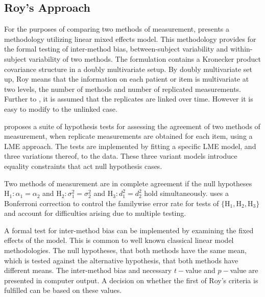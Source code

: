 \documentclass[12pt, a4paper]{report}
\theoremstyle{plain}
\theoremstyle{definition}
\theoremstyle{remark}
\begin{document}






		\subsection{Roy's Approach}
		
		For the purposes of comparing two methods of measurement, \citet{ARoy2009} presents a methodology utilizing linear mixed effects model. This methodology provides for the formal testing of inter-method bias, between-subject variability and within-subject variability of two methods. The formulation contains a Kronecker product covariance structure in a doubly multivariate setup. By doubly multivariate set up, Roy means that the information on each patient or item is multivariate at two levels, the number of methods and number of replicated measurements. Further to \citet{lam}, it is assumed that the replicates are linked over time. However it is easy to modify to the unlinked case.
		

	
	
			\citet{ARoy2009} proposes a suite of hypothesis tests for assessing the agreement of two methods of measurement, when replicate measurements are obtained for each item, using a LME approach. The tests are implemented by fitting a specific LME model, and three variations thereof, to the data. These three variant models introduce equality constraints that act null hypothesis cases.
			
			Two methods of measurement are in complete agreement if the null hypotheses $\mathrm{H}_1\colon \alpha_1 = \alpha_2$ and $\mathrm{H}_2\colon \sigma^2_1 = \sigma^2_2 $ and $\mathrm{H}_3\colon d^2_1= d^2_2$ hold simultaneously. \citet{ARoy2009} uses a Bonferroni correction to control the familywise error rate for tests of $\{\mathrm{H}_1, \mathrm{H}_2, \mathrm{H}_3\}$ and account for difficulties arising due to multiple testing. 
				
		A formal test for inter-method bias can be implemented by examining the fixed effects of the model. This is common to well known classical linear model methodologies. The null hypotheses, that both methods have the same mean, which is tested against the alternative hypothesis, that both methods have different means.
		The inter-method bias and necessary $t-$value and $p-$value are presented in computer output. A decision on whether the first of Roy's criteria is fulfilled can be based on these values.
		
\end{document}

